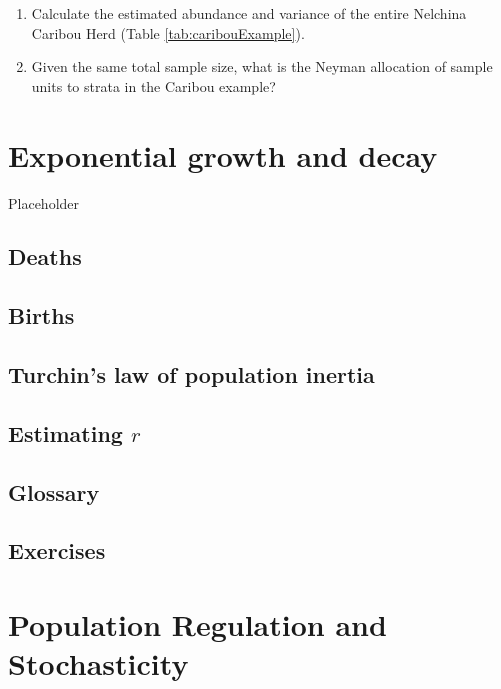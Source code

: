 \documentclass[]{book}
\theoremstyle{definition}
\theoremstyle{definition}
\theoremstyle{definition}
\theoremstyle{remark}
\begin{document}
\begin{enumerate}
\def\labelenumi{\arabic{enumi}.}
\item
  Calculate the estimated abundance and variance of the entire Nelchina
  Caribou Herd (Table \ref{tab:caribouExample}).
\item
  Given the same total sample size, what is the Neyman allocation of
  sample units to strata in the Caribou example?
\end{enumerate}

\hypertarget{chap:exponential}{%
\chapter{Exponential growth and decay}\label{chap:exponential}}

Placeholder

\hypertarget{deaths}{%
\section{Deaths}\label{deaths}}

\hypertarget{births}{%
\section{Births}\label{births}}

\hypertarget{turchins-law-of-population-inertia}{%
\section{Turchin's law of population
inertia}\label{turchins-law-of-population-inertia}}

\hypertarget{estimating-r}{%
\section{\texorpdfstring{Estimating
\(r\)}{Estimating r}}\label{estimating-r}}

\hypertarget{glossary-1}{%
\section{Glossary}\label{glossary-1}}

\hypertarget{exercises-2}{%
\section{Exercises}\label{exercises-2}}

\hypertarget{chap:regulation}{%
\chapter{Population Regulation and
Stochasticity}\label{chap:regulation}}
\end{document}
